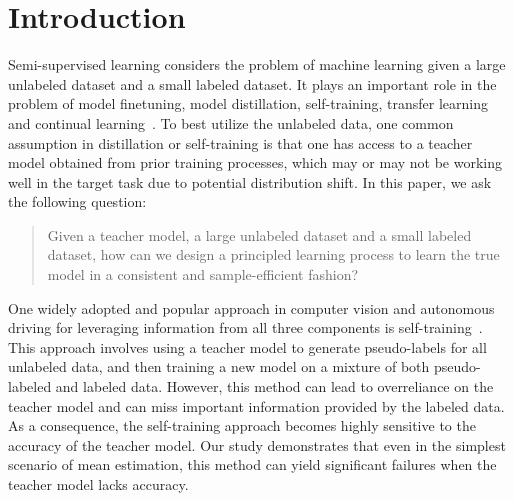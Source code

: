 \section{Introduction}

Semi-supervised learning considers the problem of machine learning given a large unlabeled dataset and a small labeled dataset. It plays an important role in the problem of model finetuning, model distillation, self-training, transfer learning and continual learning~\citep{zhu2005semi,pan2010survey, weiss2016survey, gou2021knowledge, de2021continual}. To best utilize the unlabeled data, one common assumption in distillation or self-training is that one has access to a teacher model obtained from prior training processes,  which may or may not be working well in the target task due to potential distribution shift. 
In this paper, we ask the following question:
\begin{quote}
    Given a teacher model, a large unlabeled dataset and a small labeled dataset, how can we design a principled learning process to learn the true model in a consistent and sample-efficient fashion?
\end{quote}

One widely adopted and popular approach in computer vision and autonomous driving for leveraging information from all three components is self-training~\citep{pseudolabel2013,berthelot2019mixmatch,berthelot2019remixmatch,sohn2020fixmatch, xie2020self, jiang2022improving, qi2021offboard}. This approach involves using a teacher model to generate pseudo-labels for all unlabeled data, and then training a new model on a mixture of both pseudo-labeled and labeled data. However, this method can lead to overreliance on the teacher model and can miss important information provided by the labeled data. As a consequence, the self-training approach becomes highly sensitive to the accuracy of the teacher model. Our study demonstrates that even in the simplest scenario of mean estimation, this method can yield significant failures when the teacher model lacks accuracy.



 

